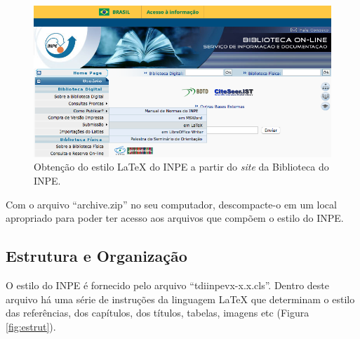 \begin{figure}[H]
    \centering
    \includegraphics[scale=0.5]{./figs/biblio_pub_latex.png}
    \caption{Obtenção do estilo \LaTeX{} do INPE a partir do \textit{site} da Biblioteca do INPE.}
    \label{fig:biblio_pub_latex}
\end{figure}

Com o arquivo ``archive.zip'' no seu computador, descompacte-o em um local apropriado para poder ter acesso aos arquivos que compõem o estilo do INPE.


\subsection{Estrutura e Organização}
\label{sec:estrut}

O estilo do INPE é fornecido pelo arquivo ``tdiinpevx-x.x.cls''. Dentro deste arquivo há uma série de instruções da linguagem \LaTeX{} que determinam o estilo das referências, dos capítulos, dos títulos, tabelas, imagens etc (Figura \ref{fig:estrut}).

